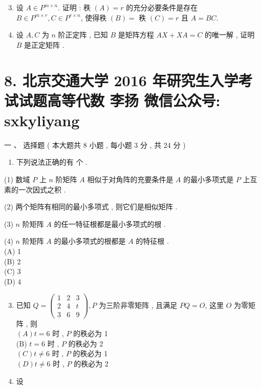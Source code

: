 \documentclass[10pt]{article}
\begin{document}
{\begin{enumerate}
  \setcounter{enumi}{2}
  \item  设  $A \in P^{m \times n}$.  证明 :  秩  $(A)=r$  的充分必要条件是存在  $B \in P^{m \times r}, C \in P^{r \times n}$,  使得秩  $(B)=$  秩  $(C)=r$  且  $A=B C$.

  \item  设  $A, C$  为  $n$  阶正定阵 ,  已知  $B$  是矩阵方程  $A X+X A=C$  的唯一解 ,  证明  $B$  是正定矩阵 .

\end{enumerate}
\section{8. 北京交通大学 2016 年研究生入学考试试题高等代数 
 李扬 
 微信公众号: sxkyliyang}
 一 、  选择题 ( 本大题共  8  小题 ,  每小题  3  分 ,  共  24  分 )

\begin{enumerate}
  \item  下列说法正确的有   个 .
\end{enumerate}
(1)  数域  $P$  上  $n$  阶矩阵  $A$  相似于对角阵的充要条件是  $A$  的最小多项式是  $P$  上互素的一次因式之积 .

(2)  两个矩阵有相同的最小多项式 ,  则它们是相似矩阵 .

(3) $n$  阶矩阵  $A$  的任一特征根都是最小多项式的根 .

(4) $n$  阶矩阵  $A$  的最小多项式的根都是  $A$  的特征根 .\\
(A) 1\\
(B) 2\\
(C) 3\\
(D) 4

\begin{enumerate}
  \setcounter{enumi}{2}
  \item  已知  $Q=\left(\begin{array}{lll}1 & 2 & 3 \\ 2 & 4 & t \\ 3 & 6 & 9\end{array}\right), P$  为三阶非零矩阵 ,  且满足  $P Q=O$,  这里  $O$  为零矩阵 ,  则 \\
$(A) t=6$  时 , $P$  的秩必为  1\\
(B) $t=6$  时 , $P$  的秩必为  2\\
$(C) t \neq 6$  时 , $P$  的秩必为  1\\
$(D) t \neq 6$  时 , $P$  的秩必为  2

  \item  设 


\end{enumerate}}
\end{document}
